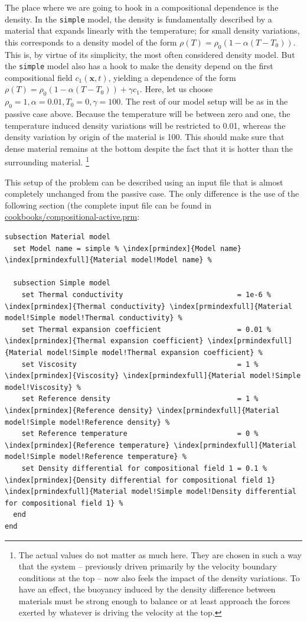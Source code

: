 \documentclass{article}
\begin{document}
The place where we are going to hook in a compositional dependence is the
density. In the \texttt{simple} model, the density is fundamentally described by
a material that expands linearly with the temperature; for small density
variations, this corresponds to a density model of the form
$\rho(T)=\rho_0(1-\alpha(T-T_0))$. This is, by virtue of its simplicity, the
most often considered density model. But the \texttt{simple} model also has a
hook to make the density depend on the first compositional field $c_1(\mathbf
x,t)$, yielding a dependence of the form
$\rho(T)=\rho_0(1-\alpha(T-T_0))+\gamma c_1$. Here, let us choose $\rho_0=1,
\alpha=0.01, T_0=0, \gamma=100$. The rest of our model setup will be as
in the passive case above. Because the temperature will be between zero and one,
the temperature induced density variations will be restricted to 0.01, whereas
the density variation by origin of the material is 100. This should make sure
that dense material remains at the bottom despite the fact that it is hotter
than the surrounding material.%
\footnote{The actual values do not matter as much here. They are chosen in such
a way that the system -- previously driven primarily by the velocity boundary
conditions at the top -- now also feels the impact of the density variations.
To have an effect, the buoyancy induced by the density difference between
materials must be strong enough to balance or at least approach the forces
exerted by whatever is driving the velocity at the top.}

This setup of the problem can be described using an input file that is almost
completely unchanged from the passive case. The only difference is the use of
the following section (the complete input file can be found in
\url{cookbooks/compositional-active.prm}:

\begin{lstlisting}[frame=single,language=prmfile,escapechar=\%]
subsection Material model
  set Model name = simple % \index[prmindex]{Model name} \index[prmindexfull]{Material model!Model name} %

  subsection Simple model
    set Thermal conductivity                           = 1e-6 % \index[prmindex]{Thermal conductivity} \index[prmindexfull]{Material model!Simple model!Thermal conductivity} %
    set Thermal expansion coefficient                  = 0.01 % \index[prmindex]{Thermal expansion coefficient} \index[prmindexfull]{Material model!Simple model!Thermal expansion coefficient} %
    set Viscosity                                      = 1 % \index[prmindex]{Viscosity} \index[prmindexfull]{Material model!Simple model!Viscosity} %
    set Reference density                              = 1 % \index[prmindex]{Reference density} \index[prmindexfull]{Material model!Simple model!Reference density} %
    set Reference temperature                          = 0 % \index[prmindex]{Reference temperature} \index[prmindexfull]{Material model!Simple model!Reference temperature} %
    set Density differential for compositional field 1 = 0.1 % \index[prmindex]{Density differential for compositional field 1} \index[prmindexfull]{Material model!Simple model!Density differential for compositional field 1} %
  end
end
\end{lstlisting}
\end{document}
